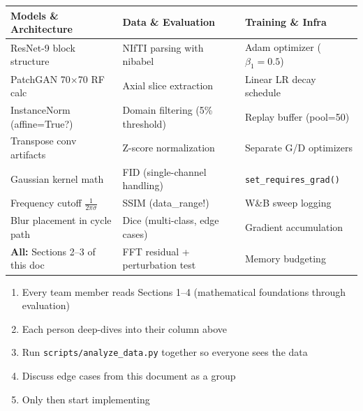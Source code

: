 \documentclass[11pt,a4paper]{article}
\theoremstyle{definition}
\begin{document}
\begin{center}
\begin{tabular}{p{4cm}p{4cm}p{4cm}}
\toprule
\textbf{Models \& Architecture} & \textbf{Data \& Evaluation} & \textbf{Training \& Infra} \\
\midrule
ResNet-9 block structure & NIfTI parsing with nibabel & Adam optimizer ($\beta_1=0.5$) \\
PatchGAN 70$\times$70 RF calc & Axial slice extraction & Linear LR decay schedule \\
InstanceNorm (affine=True?) & Domain filtering (5\% threshold) & Replay buffer (pool=50) \\
Transpose conv artifacts & Z-score normalization & Separate G/D optimizers \\
Gaussian kernel math & FID (single-channel handling) & \texttt{set\_requires\_grad()} \\
Frequency cutoff $\frac{1}{2\pi\sigma}$ & SSIM (data\_range!) & W\&B sweep logging \\
Blur placement in cycle path & Dice (multi-class, edge cases) & Gradient accumulation \\
\textbf{All:} Sections 2--3 of this doc & FFT residual + perturbation test & Memory budgeting \\
\bottomrule
\end{tabular}
\end{center}

\vspace{1em}

\begin{tcolorbox}[colback=yellow!10!white, colframe=yellow!50!black, title=\textbf{Before Writing Code}]
\begin{enumerate}
    \item Every team member reads Sections 1--4 (mathematical foundations through evaluation)
    \item Each person deep-dives into their column above
    \item Run \texttt{scripts/analyze\_data.py} together so everyone sees the data
    \item Discuss edge cases from this document as a group
    \item Only then start implementing
\end{enumerate}
\end{tcolorbox}
\end{document}
